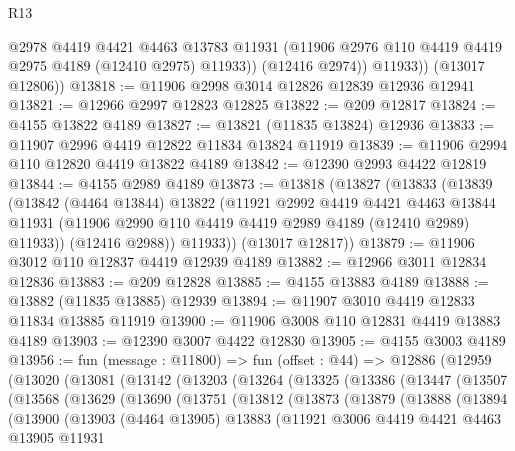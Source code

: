 \begin{lexlean}{R13}
\begin{coremodule}
              @2978
              @4419
              @4421
              @4463
              @13783
              @11931
              (@11906 @2976 @110 @4419 @4419 @2975 @4189 (@12410 @2975) @11933))
            (@12416 @2974))
          @11933))
      (@13017 @12806))
@13818 := @11906 @2998 @3014 @12826 @12839 @12936 @12941
@13821 := @12966 @2997 @12823 @12825
@13822 := @209 @12817
@13824 := @4155 @13822 @4189
@13827 := @13821 (@11835 @13824) @12936
@13833 := @11907 @2996 @4419 @12822 @11834 @13824 @11919
@13839 := @11906 @2994 @110 @12820 @4419 @13822 @4189
@13842 := @12390 @2993 @4422 @12819
@13844 := @4155 @2989 @4189
@13873 := @13818
    (@13827
      (@13833
        (@13839
          (@13842
            (@4464 @13844)
            @13822
            (@11921
              @2992
              @4419
              @4421
              @4463
              @13844
              @11931
              (@11906 @2990 @110 @4419 @4419 @2989 @4189 (@12410 @2989) @11933))
            (@12416 @2988))
          @11933))
      (@13017 @12817))
@13879 := @11906 @3012 @110 @12837 @4419 @12939 @4189
@13882 := @12966 @3011 @12834 @12836
@13883 := @209 @12828
@13885 := @4155 @13883 @4189
@13888 := @13882 (@11835 @13885) @12939
@13894 := @11907 @3010 @4419 @12833 @11834 @13885 @11919
@13900 := @11906 @3008 @110 @12831 @4419 @13883 @4189
@13903 := @12390 @3007 @4422 @12830
@13905 := @4155 @3003 @4189
@13956 := fun (message : @11800) =>
  fun (offset : @44) =>
  @12886
    (@12959
      (@13020
        (@13081
          (@13142
            (@13203
              (@13264
                (@13325
                  (@13386
                    (@13447
                      (@13507
                        (@13568
                          (@13629
                            (@13690
                              (@13751
                                (@13812
                                  (@13873
                                    (@13879
                                      (@13888
                                        (@13894
                                          (@13900
                                            (@13903
                                              (@4464 @13905)
                                              @13883
                                              (@11921
                                                @3006
                                                @4419
                                                @4421
                                                @4463
                                                @13905
                                                @11931

\end{coremodule}
\end{lexlean}
